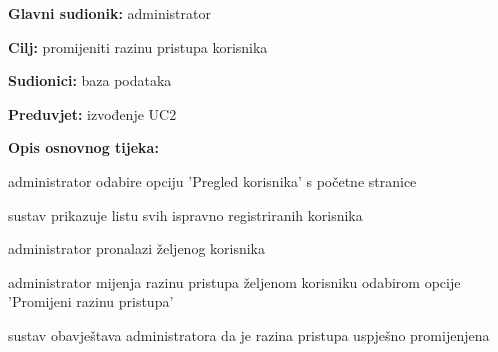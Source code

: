                     \noindent {}
					\begin{packed_item}
	
						\item \textbf{Glavni sudionik: }administrator
						\item  \textbf{Cilj:} promijeniti razinu pristupa korisnika
						\item  \textbf{Sudionici:} baza podataka
						\item  \textbf{Preduvjet:} izvođenje UC2
						\item  \textbf{Opis osnovnog tijeka:}
						
						\item[] \begin{packed_enum}
							\item administrator odabire opciju 'Pregled korisnika' s početne stranice
							\item sustav prikazuje listu svih ispravno registriranih korisnika
							\item administrator pronalazi željenog korisnika
							\item administrator mijenja razinu pristupa željenom korisniku odabirom opcije 'Promijeni razinu pristupa'
							\item sustav obavještava administratora da je razina pristupa uspješno promijenjena
                        
						\end{packed_enum}
					\end{packed_item}
        
